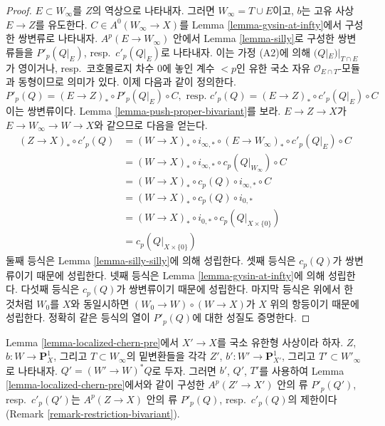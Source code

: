 \begin{proof}
$E \subset W_\infty$를 $Z$의 역상으로 나타내자. 그러면
$W_\infty = T \cup E$이고, $b$는 고유 사상 $E \to Z$를 유도한다.
$C \in A^0(W_\infty \to X)$를 Lemma \ref{lemma-gysin-at-infty}에서
구성한 쌍변류로 나타내자. $A^p(E \to W_\infty)$ 안에서 Lemma
\ref{lemma-silly}로 구성한 쌍변류들을 $P'_p(Q|_E)$,
resp.\ $c'_p(Q|_E)$로 나타내자. 이는 가정 (A2)에 의해
$(Q|_E)|_{T \cap E}$가 영이거나, resp.\ 코호몰로지 차수 $0$에 놓인
계수 $< p$인 유한 국소 자유 $\mathcal{O}_{E \cap T}$-모듈과 동형이므로
의미가 있다. 이제 다음과 같이 정의한다.
$$
P'_p(Q) = (E \to Z)_* \circ P'_p(Q|_E) \circ C,\text{ resp. }
c'_p(Q) = (E \to Z)_* \circ c'_p(Q|_E) \circ C
$$
이는 쌍변류이다. Lemma \ref{lemma-push-proper-bivariant}를 보라.
$E \to Z \to X$가 $E \to W_\infty \to W \to X$와 같으므로 다음을
얻는다.
\begin{align*}
(Z \to X)_* \circ c'_p(Q)
& =
(W \to X)_* \circ i_{\infty, *} \circ (E \to W_\infty)_*
\circ c'_p(Q|_E) \circ C \\
& =
(W \to X)_* \circ i_{\infty, *} \circ c_p(Q|_{W_\infty}) \circ C \\
& =
(W \to X)_* \circ c_p(Q) \circ i_{\infty, *} \circ C \\
& =
(W \to X)_*\circ c_p(Q) \circ i_{0, *} \\
& =
(W \to X)_* \circ i_{0, *} \circ c_p(Q|_{X \times \{0\}}) \\
& =
c_p(Q|_{X \times \{0\}})
\end{align*}
둘째 등식은 Lemma \ref{lemma-silly-silly}에 의해 성립한다. 셋째 등식은
$c_p(Q)$가 쌍변류이기 때문에 성립한다. 넷째 등식은 Lemma
\ref{lemma-gysin-at-infty}에 의해 성립한다. 다섯째 등식은 $c_p(Q)$가
쌍변류이기 때문에 성립한다. 마지막 등식은 위에서 한 것처럼 $W_0$를
$X$와 동일시하면 $(W_0 \to W) \circ (W \to X)$가 $X$ 위의 항등이기
때문에 성립한다. 정확히 같은 등식의 열이 $P'_p(Q)$에 대한 성질도
증명한다.
\end{proof}

\begin{lemma}
\label{lemma-base-change-localized-chern-pre}
Lemma \ref{lemma-localized-chern-pre}에서 $X' \to X$를 국소 유한형
사상이라 하자. $Z$, $b : W \to \mathbf{P}^1_X$, 그리고
$T \subset W_\infty$의 밑변환들을 각각 $Z'$,
$b' : W' \to \mathbf{P}^1_{X'}$, 그리고 $T' \subset W'_\infty$로
나타내자. $Q' = (W' \to W)^*Q$로 두자. 그러면 $b'$, $Q'$, $T'$를
사용하여 Lemma \ref{lemma-localized-chern-pre}에서와 같이 구성한
$A^p(Z' \to X')$ 안의 류 $P'_p(Q')$, resp.\ $c'_p(Q')$는
$A^p(Z \to X)$ 안의 류 $P'_p(Q)$, resp.\ $c'_p(Q)$의 제한이다
(Remark \ref{remark-restriction-bivariant}).
\end{lemma}

